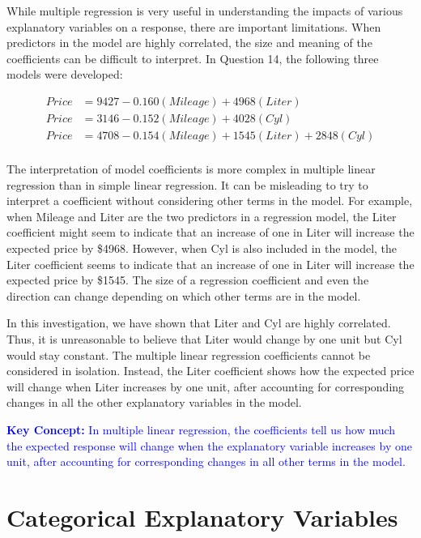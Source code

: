 \documentclass[
]{book}
\begin{document}
While multiple regression is very useful in understanding the impacts of various explanatory variables on a response, there are important limitations. When predictors in the model are highly correlated, the size and meaning of the coefficients can be difficult to interpret. In Question 14, the following three models were developed:

\begin{align*}
 Price &= 9427 - 0.160(Mileage) + 4968(Liter)\\
 Price &= 3146 - 0.152(Mileage) + 4028(Cyl)\\
 Price &= 4708 - 0.154(Mileage) + 1545(Liter) + 2848(Cyl)\\
 \end{align*}

The interpretation of model coefficients is more complex in multiple linear regression than in simple linear regression. It can be misleading to try to interpret a coefficient without considering other terms in the model. For example, when Mileage and Liter are the two predictors in a regression model, the Liter coefficient might seem to indicate that an increase of one in Liter will increase the expected price by \$4968. However, when Cyl is also included in the model, the Liter coefficient seems to indicate that an increase of one in Liter will increase the expected price by \$1545. The size of a regression coefficient and even the direction can change depending on which other terms are in the model.

In this investigation, we have shown that Liter and Cyl are highly correlated. Thus, it is unreasonable to believe that Liter would change by one unit but Cyl would stay constant. The multiple linear regression coefficients cannot be considered in isolation. Instead, the Liter coefficient shows how the expected price will change when Liter increases by one unit, after accounting for corresponding changes in all the other
explanatory variables in the model.

\textbf{\textcolor{blue}{Key Concept:}}
\textcolor{blue}{In multiple linear regression, the coefficients tell us how much the expected response will change when the explanatory variable increases by one unit, after accounting for corresponding changes in all other terms in the model.}

\hypertarget{categorical-explanatory-variables}{%
\section{Categorical Explanatory Variables}\label{categorical-explanatory-variables}}
\end{document}
